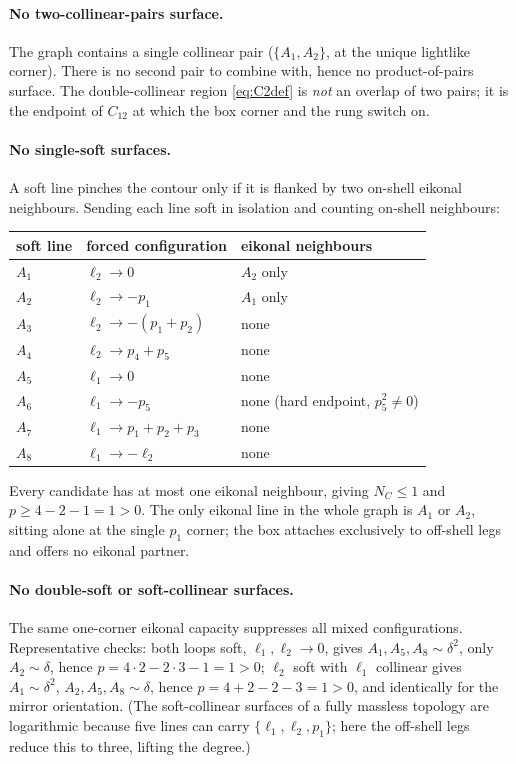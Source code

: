 \documentclass[11pt]{article}
\begin{document}
\paragraph{No two-collinear-pairs surface.} The graph contains a single collinear pair
($\{A_1,A_2\}$, at the unique lightlike corner). There is no second pair to combine with, hence no
product-of-pairs surface. The double-collinear region \eqref{eq:C2def} is \emph{not} an overlap of
two pairs; it is the endpoint of $C_{12}$ at which the box corner and the rung switch on.

\paragraph{No single-soft surfaces.} A soft line pinches the contour only if it is flanked by two
on-shell eikonal neighbours. Sending each line soft in isolation and counting on-shell
neighbours:
\begin{center}
\begin{tabular}{lll}
\toprule
soft line & forced configuration & eikonal neighbours\\
\midrule
$A_1$ & $\ell_2\to0$ & $A_2$ only\\
$A_2$ & $\ell_2\to-p_1$ & $A_1$ only\\
$A_3$ & $\ell_2\to-(p_1{+}p_2)$ & none\\
$A_4$ & $\ell_2\to p_4{+}p_5$ & none\\
$A_5$ & $\ell_1\to0$ & none\\
$A_6$ & $\ell_1\to-p_5$ & none (hard endpoint, $p_5^2\neq0$)\\
$A_7$ & $\ell_1\to p_1{+}p_2{+}p_3$ & none\\
$A_8$ & $\ell_1\to-\ell_2$ & none\\
\bottomrule
\end{tabular}
\end{center}
Every candidate has at most one eikonal neighbour, giving $N_C\le1$ and
$p\ge 4-2-1=1>0$. The only eikonal line in the whole graph is $A_1$ or $A_2$, sitting alone at the
single $p_1$ corner; the box attaches exclusively to off-shell legs and offers no eikonal partner.

\paragraph{No double-soft or soft-collinear surfaces.} The same one-corner eikonal capacity
suppresses all mixed configurations. Representative checks: both loops soft, $\ell_1,\ell_2\to0$,
gives $A_1,A_5,A_8\sim\delta^2$, only $A_2\sim\delta$, hence
$p=4\cdot2-2\cdot3-1=1>0$; $\ell_2$ soft with $\ell_1$ collinear gives $A_1\sim\delta^2$,
$A_2,A_5,A_8\sim\delta$, hence $p=4+2-2-3=1>0$, and identically for the mirror orientation. (The
soft-collinear surfaces of a fully massless topology are logarithmic because five lines can carry
$\{\ell_1,\ell_2,p_1\}$; here the off-shell legs reduce this to three, lifting the degree.)
\end{document}
